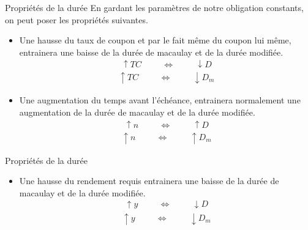 \documentclass[11pt]{beamer}
\begin{document}
\begin{frame}{Propriétés de la durée}
En gardant les paramètres de notre obligation constants,  on peut poser les propriétés suivantes.
\begin{itemize}
\item Une hausse du taux de coupon et par le fait même du coupon lui même, entrainera une baisse de la durée de macaulay et de la durée modifiée.
\begin{align*}
\uparrow TC \hspace{1cm} \Longleftrightarrow \hspace{1cm} \downarrow D 
\end{align*}
\begin{align*}
\uparrow TC \hspace{1cm} \Longleftrightarrow \hspace{1cm} \downarrow D_m 
\end{align*}
\item Une augmentation du temps avant l'échéance, entrainera normalement une augmentation de la durée de macaulay et de la durée modifiée.
\begin{align*}
\uparrow n \hspace{1cm} \Longleftrightarrow \hspace{1cm} \uparrow D 
\end{align*}
\begin{align*}
\uparrow n \hspace{1cm} \Longleftrightarrow \hspace{1cm} \uparrow D_m 
\end{align*}

\end{itemize}
\end{frame}

\begin{frame}{Propriétés de la durée}
\begin{itemize}
\item Une hausse du rendement requis entrainera une baisse de la durée de macaulay et de la durée modifiée.
\begin{align*}
\uparrow y \hspace{1cm} \Longleftrightarrow \hspace{1cm} \downarrow D 
\end{align*}
\begin{align*}
\uparrow y \hspace{1cm} \Longleftrightarrow \hspace{1cm} \downarrow D_m 
\end{align*}
\end{itemize}
\end{frame}
\end{document}
